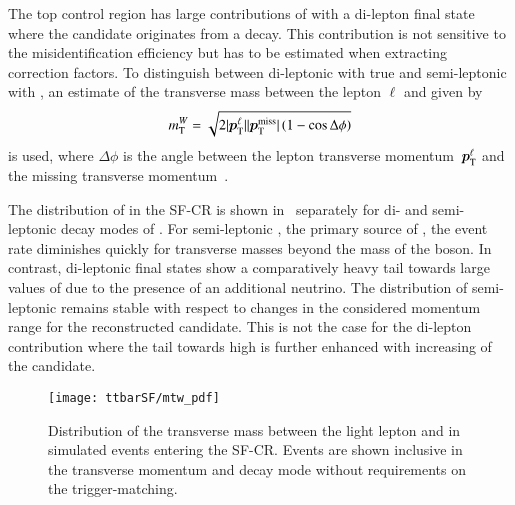 The top control region has large contributions of \ttbar with a
di-lepton final state where the \tauhadvis candidate originates from a
\tauhad decay. This contribution is not sensitive to the
\jettotauhadvis misidentification efficiency but has to be estimated
when extracting correction factors. To distinguish between di-leptonic
\ttbar with true \tauhadvis and semi-leptonic \ttbar with
\faketauhadvis, an estimate of the transverse mass between the lepton
$\ell$ and \pTmissAbs given by
\begin{align*}
  m_{\text{T}}^W = \sqrt{2 | \bm{p}_{\text{T}}^{\ell} | | \bm{p}_{\text{T}}^{\text{miss}} | \left( 1 - \cos \Delta\phi \right)}
\end{align*}
is used, where $\Delta \phi$ is the angle between the lepton
transverse momentum~$\bm{p}_{\text{T}}^{\ell}$ and the missing
transverse momentum~\pTmiss.

The distribution of \mTW in the SF-CR is shown
in~ separately for di- and semi-leptonic
decay modes of \ttbar. For semi-leptonic \ttbar, the primary source of
\faketauhadvis, the event rate diminishes quickly for transverse
masses beyond the mass of the \PW boson. In contrast, di-leptonic
\ttbar final states show a comparatively heavy tail towards large
values of \mTW due to the presence of an additional neutrino. The \mTW
distribution of semi-leptonic \ttbar remains stable with respect to
changes in the considered momentum range for the reconstructed
\tauhadvis candidate. This is not the case for the di-lepton
contribution where the tail towards high \mTW is further enhanced with
increasing \pT of the \tauhadvis candidate.


\begin{figure}[htbp]
  \centering

  \texttt{[image: ttbarSF/mtw\_pdf]}

  \caption{Distribution of the transverse mass between the light
    lepton and \pTmiss in simulated \ttbar events entering the
    SF-CR. Events are shown inclusive in the \tauhadvis transverse
    momentum and decay mode without requirements on the
    trigger-matching.}%
  \label{fig:ttbarsf_mtw_pdf}
\end{figure}

